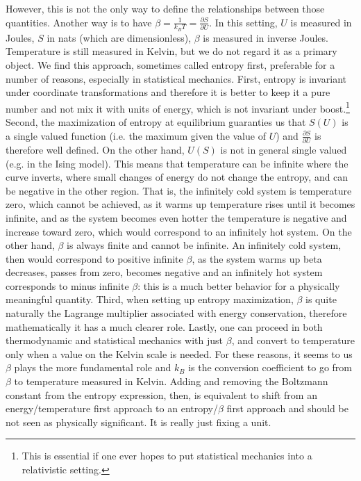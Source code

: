 \documentclass{article}
\begin{document}
However, this is not the only way to define the relationships between those quantities. Another way is to have $\beta = \frac{1}{k_B T} = \frac{\partial S}{\partial U}$. In this setting, $U$ is measured in Joules, $S$ in nats (which are dimensionless), $\beta$ is measured in inverse Joules. Temperature is still measured in Kelvin, but we do not regard it as a primary object. We find this approach, sometimes called entropy first, preferable for a number of reasons, especially in statistical mechanics. First, entropy is invariant under coordinate transformations and therefore it is better to keep it a pure number and not mix it with units of energy, which is not invariant under boost.\footnote{This is essential if one ever hopes to put statistical mechanics into a relativistic setting.} Second, the maximization of entropy at equilibrium guaranties us that $S(U)$ is a single valued function (i.e. the maximum given the value of $U$) and $\frac{\partial S}{\partial U}$ is therefore well defined. On the other hand, $U(S)$ is not in general single valued (e.g. in the Ising model). This means that temperature can be infinite where the curve inverts, where small changes of energy do not change the entropy, and can be negative in the other region. That is, the infinitely cold system is temperature zero, which cannot be achieved, as it warms up temperature rises until it becomes infinite, and as the system becomes even hotter the temperature is negative and increase toward zero, which would correspond to an infinitely hot system. On the other hand, $\beta$ is always finite and cannot be infinite. An infinitely cold system, then would correspond to positive infinite $\beta$, as the system warms up beta decreases, passes from zero, becomes negative and an infinitely hot system corresponds to minus infinite $\beta$: this is a much better behavior for a physically meaningful quantity. Third, when setting up entropy maximization, $\beta$ is quite naturally the Lagrange multiplier associated with energy conservation, therefore mathematically it has a much clearer role. Lastly, one can proceed in both thermodynamic and statistical mechanics with just $\beta$, and convert to temperature only when a value on the Kelvin scale is needed. For these reasons, it seems to us $\beta$ plays the more fundamental role and $k_B$ is the conversion coefficient to go from $\beta$ to temperature measured in Kelvin. Adding and removing the Boltzmann constant from the entropy expression, then, is equivalent to shift from an energy/temperature first approach to an entropy/$\beta$ first approach and should be not seen as physically significant. It is really just fixing a unit.
\end{document}
